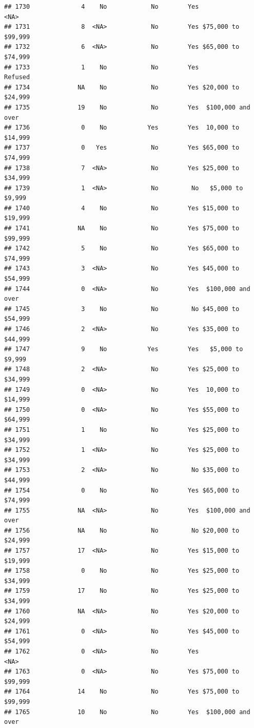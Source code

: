 \documentclass[man]{apa6}
\begin{document}
\begin{verbatim}
## 1730              4    No            No        Yes               <NA>
## 1731              8  <NA>            No        Yes $75,000 to $99,999
## 1732              6  <NA>            No        Yes $65,000 to $74,999
## 1733              1    No            No        Yes            Refused
## 1734             NA    No            No        Yes $20,000 to $24,999
## 1735             19    No            No        Yes  $100,000 and over
## 1736              0    No           Yes        Yes  10,000 to $14,999
## 1737              0   Yes            No        Yes $65,000 to $74,999
## 1738              7  <NA>            No        Yes $25,000 to $34,999
## 1739              1  <NA>            No         No   $5,000 to $9,999
## 1740              4    No            No        Yes $15,000 to $19,999
## 1741             NA    No            No        Yes $75,000 to $99,999
## 1742              5    No            No        Yes $65,000 to $74,999
## 1743              3  <NA>            No        Yes $45,000 to $54,999
## 1744              0  <NA>            No        Yes  $100,000 and over
## 1745              3    No            No         No $45,000 to $54,999
## 1746              2  <NA>            No        Yes $35,000 to $44,999
## 1747              9    No           Yes        Yes   $5,000 to $9,999
## 1748              2  <NA>            No        Yes $25,000 to $34,999
## 1749              0  <NA>            No        Yes  10,000 to $14,999
## 1750              0  <NA>            No        Yes $55,000 to $64,999
## 1751              1    No            No        Yes $25,000 to $34,999
## 1752              1  <NA>            No        Yes $25,000 to $34,999
## 1753              2  <NA>            No         No $35,000 to $44,999
## 1754              0    No            No        Yes $65,000 to $74,999
## 1755             NA  <NA>            No        Yes  $100,000 and over
## 1756             NA    No            No         No $20,000 to $24,999
## 1757             17  <NA>            No        Yes $15,000 to $19,999
## 1758              0    No            No        Yes $25,000 to $34,999
## 1759             17    No            No        Yes $25,000 to $34,999
## 1760             NA  <NA>            No        Yes $20,000 to $24,999
## 1761              0  <NA>            No        Yes $45,000 to $54,999
## 1762              0  <NA>            No        Yes               <NA>
## 1763              0  <NA>            No        Yes $75,000 to $99,999
## 1764             14    No            No        Yes $75,000 to $99,999
## 1765             10    No            No        Yes  $100,000 and over

\end{verbatim}
\end{document}
